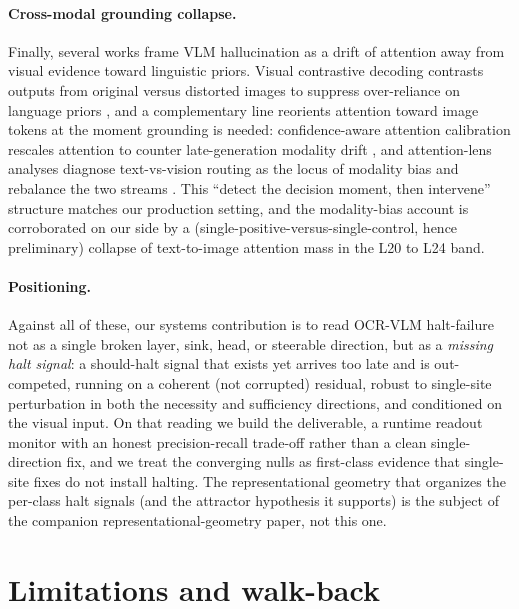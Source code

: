 \documentclass[11pt]{article}
\begin{document}
\paragraph{Cross-modal grounding collapse.}
Finally, several works frame VLM hallucination as a drift of attention away from visual
evidence toward linguistic priors. Visual contrastive decoding contrasts outputs from
original versus distorted images to suppress over-reliance on language priors
\citep{leng2024vcd}, and a complementary line reorients attention toward image tokens at
the moment grounding is needed: confidence-aware attention calibration rescales attention
to counter late-generation modality drift \citep{fazli2025caac}, and attention-lens
analyses diagnose text-vs-vision routing as the locus of modality bias and rebalance the
two streams \citep{zheng2025modalitybias}. This ``detect the decision moment, then
intervene'' structure matches our production setting, and the modality-bias account is
corroborated on our side by a (single-positive-versus-single-control, hence preliminary)
collapse of text-to-image attention mass in the L20 to L24 band.

\paragraph{Positioning.}
Against all of these, our systems contribution is to read OCR-VLM halt-failure not as a
single broken layer, sink, head, or steerable direction, but as a \emph{missing halt
signal}: a should-halt signal that exists yet arrives too late and is out-competed, running
on a coherent (not corrupted) residual, robust to single-site perturbation in both the
necessity and sufficiency directions, and conditioned on the visual input. On that reading
we build the deliverable, a runtime readout monitor with an honest precision-recall
trade-off rather than a clean single-direction fix, and we treat the converging nulls as
first-class evidence that single-site fixes do not install halting. The representational
geometry that organizes the per-class halt signals (and the attractor hypothesis it
supports) is the subject of the companion representational-geometry paper, not this one.

\section{Limitations and walk-back}
\label{sec:limitations}
\end{document}
